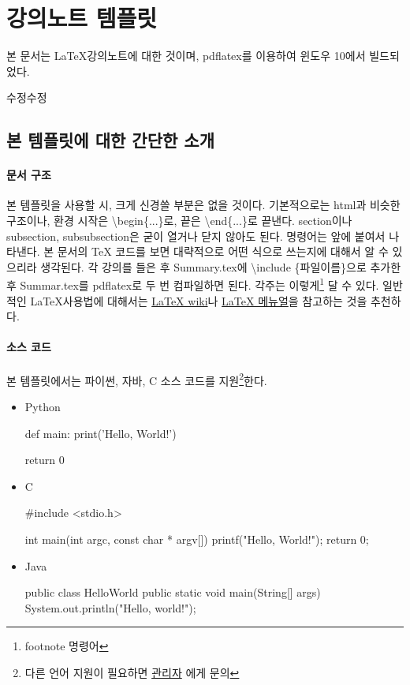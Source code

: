 \section{강의노트 템플릿} 

본 문서는 \LaTeX 강의노트에 대한 것이며, pdflatex를 이용하여 윈도우 10에서 빌드되었다.

수정수정

\subsection{본 템플릿에 대한 간단한 소개}

\paragraph{문서 구조} 본 템플릿을 사용할 시, 크게 신경쓸 부분은 없을 것이다. 기본적으로는 html과 비슷한 구조이나, 환경 시작은 {\textbackslash}begin\{...\}로, 끝은 {\textbackslash}end\{...\}로 끝낸다. section이나 subsection, subsubsection은 굳이 열거나 닫지 않아도 된다. 명령어는  앞에 붙여서 나타낸다. 본 문서의 TeX 코드를 보면 대략적으로 어떤 식으로 쓰는지에 대해서 알 수 있으리라 생각된다. 각 강의를 들은 후 Summary.tex에 \textbackslash include \{파일이름\}으로 추가한 후 Summar.tex를 pdflatex로 두 번 컴파일하면 된다. 각주는 이렇게\footnote{footnote 명령어} 달 수 있다. 일반적인 \LaTeX 사용법에 대해서는 \href{http://legacy-wiki.dgoon.net/doku.php?id=latex:latex}{LaTeX wiki}나 \href{http://ftp.isu.edu.tw/pub/Unix/CTAN/info/lshort/korean/lshort-kr.pdf}{LaTeX 메뉴얼}을 참고하는 것을 추천하다.

\paragraph{소스 코드} 본 템플릿에서는 파이썬, 자바, C 소스 코드를 지원\footnote{다른 언어 지원이 필요하면 \href{mailto:principia\_12@kaist.ac.kr}{관리자} 에게 문의}한다. 
\begin{itemize} 

\item{Python} 

\begin{Python} 
def main:
    print('Hello, World!')
    
    return 0
    
\end{Python} 

\item{C}


\begin{C} 
#include <stdio.h>

int main(int argc, const char * argv[]) 
{
    printf("Hello, World!\n");
    return 0;
}    
\end{C} 

\item{Java}

\begin{Java} 
public class HelloWorld {
    public static void main(String[] args) {
        System.out.println("Hello, world!");
    }
}
\end{Java} 

\end{itemize}

    
